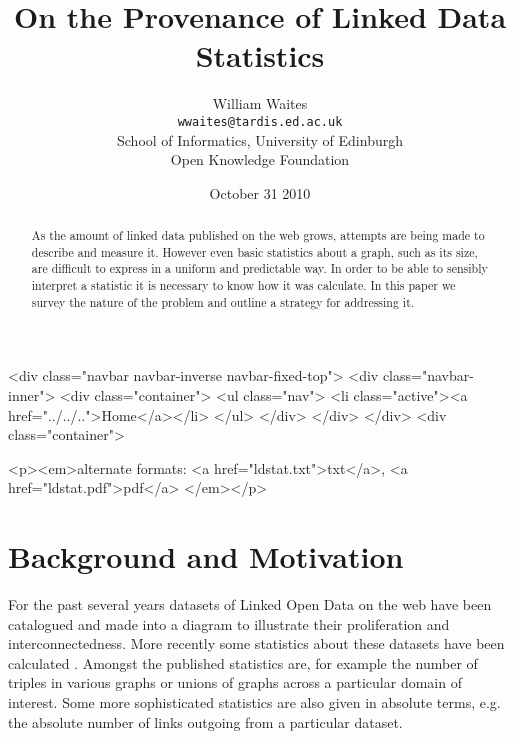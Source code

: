 \documentclass{article}
\begin{document}
\begin{htmlonly}
  \begin{rawhtml}
    <div class="navbar navbar-inverse navbar-fixed-top">
      <div class="navbar-inner">
	<div class="container">
          <ul class="nav">
            <li class="active"><a href="../../..">Home</a></li>
          </ul>
	</div>
      </div>
    </div>
    <div class="container">
  \end{rawhtml}
\end{htmlonly}
\title{On the Provenance of Linked Data Statistics}
\date{October 31 2010}
\author{William Waites\\
  \texttt{wwaites@tardis.ed.ac.uk}\\
  School of Informatics, University of Edinburgh\\
  Open Knowledge Foundation
}
\maketitle 
\begin{htmlonly}
  \begin{center}
  \begin{rawhtml}
    <p><em>alternate formats: 
        <a href="ldstat.txt">txt</a>,
        <a href="ldstat.pdf">pdf</a>
    </em></p>
  \end{rawhtml}
  \end{center}
\end{htmlonly}
\begin{abstract}
  As the amount of linked data published on the web grows,
  attempts are being made to describe and measure it. However
  even basic statistics about a graph, such as its size, 
  are difficult to express in a uniform and predictable
  way. In order to be able to sensibly interpret a statistic
  it is necessary to know how it was calculate. In this paper
  we survey the nature of the problem and outline a strategy
  for addressing it.
\end{abstract}

\section{Background and Motivation}

For the past several years datasets of Linked Open Data on
the web have been catalogued and made into a diagram 
\cite{LODC10} to illustrate their proliferation and 
interconnectedness. More recently some statistics about
these datasets have been calculated \cite{LODS10}. 
Amongst the published statistics are, for example the number
of triples in various graphs or unions of graphs across
a particular domain of interest. Some more sophisticated
statistics are also given in absolute terms, e.g. the
absolute number of links outgoing from a particular
dataset.
\end{document}
